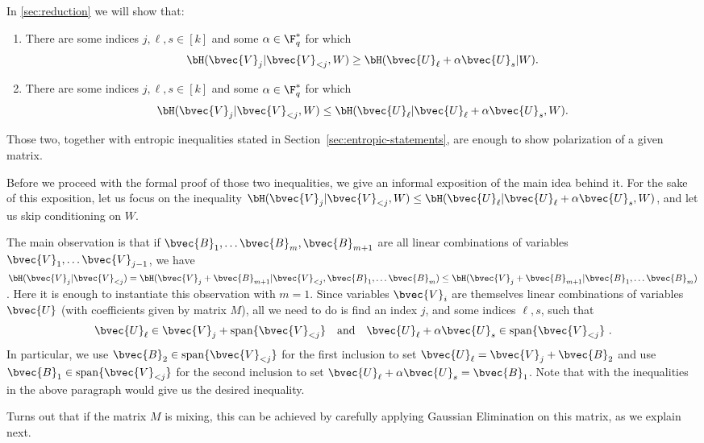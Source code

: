\documentclass[11pt]{article}
\begin{document}
In \cref{sec:reduction} we will show that:
\begin{enumerate}
	\item  There are some indices $j, \ell, s \in [k]$ and some $\alpha \in \F_q^*$
	for which
	$$\bH(\bvec{V}_j | \bvec{V}_{< j}, {W})
	\geq \bH(\bvec{U}_\ell + \alpha \bvec{U}_s | {W}).$$
	\item  There are some indices $j, \ell, s \in [k]$ and some $\alpha \in \F_q^*$
	for which
	$$\bH(\bvec{V}_j | \bvec{V}_{< j}, {W}) \leq \bH(\bvec{U}_\ell | \bvec{U}_\ell + \alpha \bvec{U}_s, {W}).$$
\end{enumerate}

Those two, together with entropic inequalities stated in
Section~\ref{sec:entropic-statements}, are enough to show polarization of a given matrix. 

Before we proceed with the formal proof of those two inequalities, we give an informal exposition of the main idea behind it. For the sake of this exposition, let us focus on the inequality $\bH(\bvec{V}_j | \bvec{V}_{<j}, W) \leq \bH(\bvec{U}_\ell | \bvec{U}_\ell + \alpha \bvec{U}_s, W)$, and let us skip conditioning on $W$. 

The main observation is that if $\bvec{B}_1, \ldots \bvec{B}_m, \bvec{B}_{m+1}$ are all linear combinations of variables $\bvec{V}_1, \ldots \bvec{V}_{j-1}$, we have $\bH(\bvec{V}_j | \bvec{V}_{<j}) = \bH(\bvec{V}_j + \bvec{B}_{m+1} | \bvec{V}_{<j}, \bvec{B}_1, \ldots \bvec{B}_m) \leq \bH(\bvec{V}_j + \bvec{B}_{m+1} | \bvec{B}_1, \ldots \bvec{B}_m)$. Here it is enough to instantiate this observation with $m=1$. Since variables $\bvec{V}_i$ are themselves linear combinations of variables $\bvec{U}$ (with coefficients given by matrix $M$), all we need to do is find an index $j$, and some indices $\ell, s$, such that
\begin{equation}
	\label{eq:U_l-and-U_s}
	\bvec{U}_\ell \in \bvec{V}_j + \mathrm{span}\{\bvec{V}_{<j}\}  \quad \text{and} \quad \bvec{U}_{\ell} + \alpha \bvec{U}_s \in \mathrm{span}\{\bvec{V}_{<j}\}  \ . 
\end{equation}
In particular, we use $\bvec{B}_2\in \mathrm{span}\{\bvec{V}_{<j}\}$ for the first inclusion to set $\bvec{U}_\ell = \bvec{V}_j+\bvec{B}_2$ and use $\bvec{B}_1\in \mathrm{span}\{\bvec{V}_{<j}\}$ for the  second inclusion to set $\bvec{U}_{\ell} + \alpha \bvec{U}_s=\bvec{B}_1$. Note that with the inequalities in the above paragraph would give us the desired inequality.


Turns out that if the matrix $M$ is mixing, this can be achieved by carefully applying Gaussian Elimination on this matrix, as we explain next. 
\end{document}

